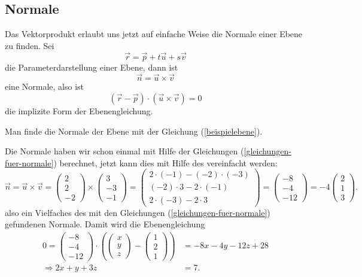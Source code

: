 \subsection{Normale}
Das Vektorprodukt erlaubt uns jetzt auf einfache Weise die Normale einer
Ebene zu finden.
Sei
\[
\vec r=\vec p+t\vec u+s\vec v
\]
die Parameterdarstellung einer Ebene, dann ist
\[
\vec n=\vec u\times\vec v
\]
eine Normale, also ist
\[
(\vec r-\vec p)\cdot (\vec u\times\vec v)=0
\]
die implizite Form der Ebenengleichung.

\begin{beispiel}
Man finde die Normale der Ebene mit der Gleichung (\ref{beispielebene}).

\smallskip
{\parindent 0pt Die Normale haben wir schon einmal mit Hilfe der Gleichungen
(\ref{gleichungen-fuer-normale}) berechnet, jetzt kann dies
mit Hilfe des vereinfacht werden:}
\begin{equation}
\vec n = \vec u\times \vec v=
\begin{pmatrix}2\\2\\-2\end{pmatrix}
\times
\begin{pmatrix}3\\-3\\-1\end{pmatrix}
=
\begin{pmatrix}
2\cdot(-1)-(-2)\cdot(-3)\\
(-2)\cdot 3-2\cdot (-1)\\
2\cdot(-3)-2\cdot 3
\end{pmatrix}
=
\begin{pmatrix}
-8\\
-4\\
-12
\end{pmatrix}
=-4\begin{pmatrix}2\\1\\3\end{pmatrix}.
\label{beispielvektorprodukt}
\end{equation}
also ein Vielfaches des mit den Gleichungen (\ref{gleichungen-fuer-normale})
gefundenen Normale.
Damit wird die Ebenengleichung
\begin{align*}
0=
\begin{pmatrix} -8\\ -4\\ -12 \end{pmatrix}\cdot
\left(
\begin{pmatrix}x\\y\\z\end{pmatrix}
-
\begin{pmatrix}1\\2\\1 \end{pmatrix}
\right)
&=
-8x-4y-12z+
28
\\
\Rightarrow
2x+y+3z&=7.
\end{align*}
\end{beispiel}

